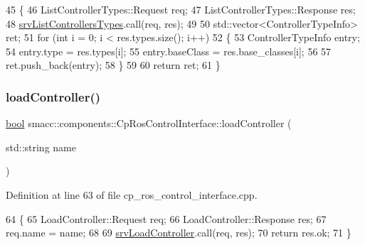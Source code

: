 \begin{DoxyCode}
45 \{
46     ListControllerTypes::Request req;
47     ListControllerTypes::Response res;
48     \hyperlink{classsmacc_1_1components_1_1CpRosControlInterface_a5a4983fca48da646b5fc94ce1f0e4114}{srvListControllersTypes}.call(req, res);
49 
50     std::vector<ControllerTypeInfo> ret;
51     \textcolor{keywordflow}{for} (\textcolor{keywordtype}{int} i = 0; i < res.types.size(); i++)
52     \{
53         ControllerTypeInfo entry;
54         entry.type = res.types[i];
55         entry.baseClass = res.base\_classes[i];
56 
57         ret.push\_back(entry);
58     \}
59 
60     \textcolor{keywordflow}{return} ret;
61 \}
\end{DoxyCode}
\mbox{\label{classsmacc_1_1components_1_1CpRosControlInterface_ab810c680f5429731c9c83345f9821016}} 
\subsubsection{\texorpdfstring{load\+Controller()}{loadController()}}
{\footnotesize\ttfamily \hyperlink{classbool}{bool} smacc\+::components\+::\+Cp\+Ros\+Control\+Interface\+::load\+Controller (\begin{DoxyParamCaption}\item[{std\+::string}]{name }\end{DoxyParamCaption})}



Definition at line 63 of file cp\+\_\+ros\+\_\+control\+\_\+interface.\+cpp.


\begin{DoxyCode}
64 \{
65     LoadController::Request req;
66     LoadController::Response res;
67     req.name = name;
68 
69     \hyperlink{classsmacc_1_1components_1_1CpRosControlInterface_aa6c1440534d6a825644f0c3620461b72}{srvLoadController}.call(req, res);
70     \textcolor{keywordflow}{return} res.ok;
71 \}
\end{DoxyCode}
\mbox{\label{classsmacc_1_1components_1_1CpRosControlInterface_a469bdb5723a9ab66d6b0a7908d5891bf}} 
